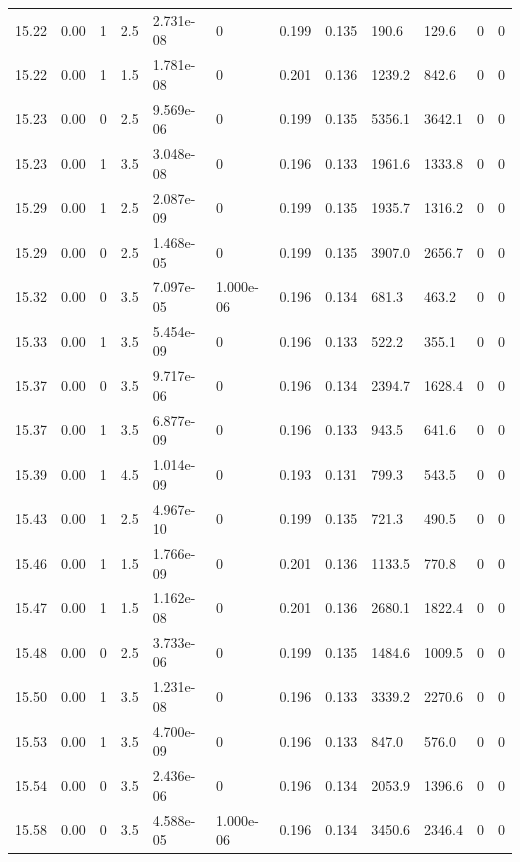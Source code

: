 \documentclass[preview]{standalone}
\begin{document}
{{{{{{{{{{{{{{{{\begin{tabular}{L{1.2cm}C{1.2cm} C{0.3cm}C{0.5cm} C{1.4cm}C{1.4cm} C{1.4cm}C{1.4cm} C{1.6cm}C{1.6cm} C{1.6cm}C{1.6cm}}
  15.22  &  0.00  & 1     & 2.5 &  2.731e-08  & 0  &  0.199&   0.135& 190.6 & 129.6   &  0 & 0  \\ 
  15.22  &  0.00  & 1     & 1.5 &  1.781e-08  & 0  &  0.201&   0.136& 1239.2 & 842.6   &  0 & 0  \\ 
  15.23  &  0.00  & 0     & 2.5 &  9.569e-06  & 0  &  0.199&   0.135& 5356.1 & 3642.1   &  0 & 0  \\ 
  15.23  &  0.00  & 1     & 3.5 &  3.048e-08  & 0  &  0.196&   0.133& 1961.6 & 1333.8   &  0 & 0  \\ 
  15.29  &  0.00  & 1     & 2.5 &  2.087e-09  & 0  &  0.199&   0.135& 1935.7 & 1316.2   &  0 & 0  \\ 
  15.29  &  0.00  & 0     & 2.5 &  1.468e-05  & 0  &  0.199&   0.135& 3907.0 & 2656.7   &  0 & 0  \\ 
  15.32  &  0.00  & 0     & 3.5 &  7.097e-05  & 1.000e-06  &  0.196&   0.134& 681.3 & 463.2   &  0 & 0  \\ 
  15.33  &  0.00  & 1     & 3.5 &  5.454e-09  & 0  &  0.196&   0.133& 522.2 & 355.1   &  0 & 0  \\ 
  15.37  &  0.00  & 0     & 3.5 &  9.717e-06  & 0  &  0.196&   0.134& 2394.7 & 1628.4   &  0 & 0  \\ 
  15.37  &  0.00  & 1     & 3.5 &  6.877e-09  & 0  &  0.196&   0.133& 943.5 & 641.6   &  0 & 0  \\ 
  15.39  &  0.00  & 1     & 4.5 &  1.014e-09  & 0  &  0.193&   0.131& 799.3 & 543.5   &  0 & 0  \\ 
  15.43  &  0.00  & 1     & 2.5 &  4.967e-10  & 0  &  0.199&   0.135& 721.3 & 490.5   &  0 & 0  \\ 
  15.46  &  0.00  & 1     & 1.5 &  1.766e-09  & 0  &  0.201&   0.136& 1133.5 & 770.8   &  0 & 0  \\ 
  15.47  &  0.00  & 1     & 1.5 &  1.162e-08  & 0  &  0.201&   0.136& 2680.1 & 1822.4   &  0 & 0  \\ 
  15.48  &  0.00  & 0     & 2.5 &  3.733e-06  & 0  &  0.199&   0.135& 1484.6 & 1009.5   &  0 & 0  \\ 
  15.50  &  0.00  & 1     & 3.5 &  1.231e-08  & 0  &  0.196&   0.133& 3339.2 & 2270.6   &  0 & 0  \\ 
  15.53  &  0.00  & 1     & 3.5 &  4.700e-09  & 0  &  0.196&   0.133& 847.0 & 576.0   &  0 & 0  \\ 
  15.54  &  0.00  & 0     & 3.5 &  2.436e-06  & 0  &  0.196&   0.134& 2053.9 & 1396.6   &  0 & 0  \\ 
  15.58  &  0.00  & 0     & 3.5 &  4.588e-05  & 1.000e-06  &  0.196&   0.134& 3450.6 & 2346.4   &  0 & 0  \\ 

\end{tabular}}}}}}}}}}}}}}}}}
\end{document}
